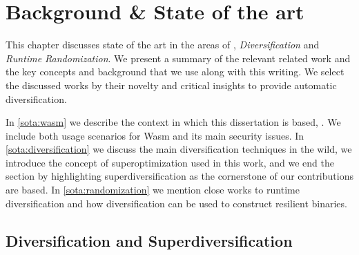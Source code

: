 \chapter{Background \& State of the art}

This chapter discusses state of the art in the areas of \emph{\wasm}, \emph{Diversification} and \emph{Runtime Randomization}. We present a summary of the relevant related work and the key concepts and background that we use along with this writing. 
We select the discussed works by their novelty and critical insights to provide automatic diversification. 

In \autoref{sota:wasm} we describe the context in which this dissertation is based, \wasm. We include both usage scenarios for Wasm and its main security issues. In \autoref{sota:diversification} we discuss the main diversification techniques in the wild, we introduce the concept of superoptimization used in this work, and we end the section by highlighting superdiversification as the cornerstone of our contributions are based. In \autoref{sota:randomization} we mention close works to runtime diversification and how diversification can be used to construct resilient binaries. 


\begin{comment}

\todo{Motivate Wasm here}

\todo{Our area is on wasm, compilers, etc}

\todo{The key related work are in the area of X and Y}

\todo{Wasm is not the context ! Define what the context is : compilers, machine code, portable code, Wasm, interpreters, backend, etc. Use background instead of context. Put everythin that is related to the thesis, concepts. }

\todo{Portable code to be distributed}

\end{comment}




\section{Diversification and Superdiversification}
\label{sota:diversification}



